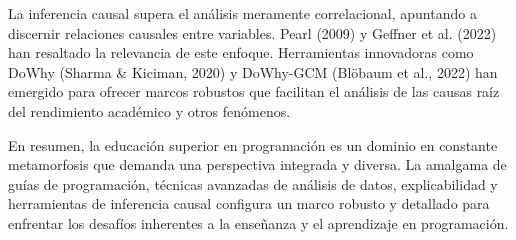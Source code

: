 La inferencia causal supera el análisis meramente correlacional, apuntando a discernir relaciones causales entre variables. Pearl (2009) \cite{pearl2009introduction} y Geffner et al. (2022) \cite{geffner2022deep} han resaltado la relevancia de este enfoque. Herramientas innovadoras como DoWhy (Sharma \& Kiciman, 2020) \cite{sharma2020dowhy} y DoWhy-GCM (Blöbaum et al., 2022) \cite{blobaum2022dowhy} han emergido para ofrecer marcos robustos que facilitan el análisis de las causas raíz del rendimiento académico y otros fenómenos.

En resumen, la educación superior en programación es un dominio en constante metamorfosis que demanda una perspectiva integrada y diversa. La amalgama de guías de programación, técnicas avanzadas de análisis de datos, explicabilidad y herramientas de inferencia causal configura un marco robusto y detallado para enfrentar los desafíos inherentes a la enseñanza y el aprendizaje en programación.
